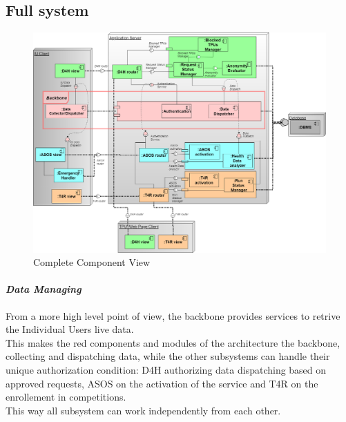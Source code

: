 \subsection{Full system}
\begin{figure}[H]
\label{fig:ComponentDiagram}
\caption{Complete Component View}
\centering
\includegraphics[width = \textwidth]{sections/architecturalDesign/ComponentDiagram.png}
\end{figure}
\paragraph{\textit{Data Managing}} From a more high level point of view, the backbone provides services to retrive the Individual Users live data. \\
This makes the red components and modules of the architecture the backbone, collecting and dispatching data, while the other subsystems can handle their unique authorization condition: D4H authorizing data dispatching based on approved requests, ASOS on the activation of the service and T4R on the enrollement in competitions. \\
This way all subsystem can work independently from each other.%
